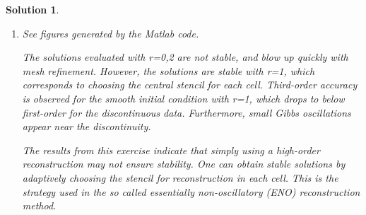 \documentclass[10pt,letterpaper]{article}
\theoremstyle{break}
\newtheorem{mysolution}{Solution}
\newenvironment{solution}{\begin{mysolution}}{\end{mysolution}}
\begin{document}
\begin{solution}
\begin{enumerate}
		
		\item
		See figures generated by the Matlab code.
		
		The solutions evaluated with r=0,2 are not stable, and blow up quickly with mesh refinement. However, the solutions are stable with r=1, which corresponds to choosing the central stencil for each cell. Third-order accuracy is observed for the smooth initial condition with r=1, which drops to below first-order for the discontinuous data. Furthermore, small Gibbs oscillations appear near the discontinuity.
		
		The results from this exercise indicate that simply using a high-order reconstruction may not ensure stability. One can obtain stable solutions by adaptively choosing the stencil for reconstruction in each cell. This is the strategy used in the so called \textit{essentially non-oscillatory} (ENO) reconstruction method.
		
		
	\end{enumerate}
		
		
\end{solution}
\end{document}
